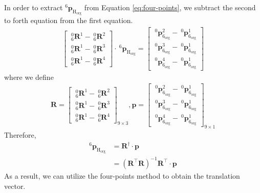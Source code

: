 \par
In order to extract $^\mathrm{6}\!\boldsymbol{p}_\mathrm{H_{org}}$ from Equation \ref{eq:four-points}, we subtract the second to forth equation from the first equation.
\begin{equation}
\begin{split}	
\begin{bmatrix}
\  _{\mathrm{6}}^{\mathrm{0}}\mathbf{R}^{1} - \  _{\mathrm{6}}^{\mathrm{0}}\mathbf{R}^{2}\\ 
\  _{\mathrm{6}}^{\mathrm{0}}\mathbf{R}^{1} - \  _{\mathrm{6}}^{\mathrm{0}}\mathbf{R}^{3}\\ 
\  _{\mathrm{6}}^{\mathrm{0}}\mathbf{R}^{1} - \  _{\mathrm{6}}^{\mathrm{0}}\mathbf{R}^{4}
\end{bmatrix}
\cdot\ ^\mathrm{6}\!\boldsymbol{p}_\mathrm{H_{org}}
=
\begin{bmatrix}
\ ^\mathrm{0}\!\boldsymbol{p}_\mathrm{6_{org}}^{2} -\ ^\mathrm{0}\!\boldsymbol{p}_\mathrm{6_{org}}^{1} \\ 
\ ^\mathrm{0}\!\boldsymbol{p}_\mathrm{6_{org}}^{3} -\ ^\mathrm{0}\!\boldsymbol{p}_\mathrm{6_{org}}^{1} \\ 
\ ^\mathrm{0}\!\boldsymbol{p}_\mathrm{6_{org}}^{4} -\ ^\mathrm{0}\!\boldsymbol{p}_\mathrm{6_{org}}^{1} 
\end{bmatrix}
\end{split}
\end{equation}
where we define
\begin{equation*}
\begin{split}
\mathbf{R} =  
\begin{bmatrix}
\  _{\mathrm{6}}^{\mathrm{0}}\mathbf{R}^{1} - \  _{\mathrm{6}}^{\mathrm{0}}\mathbf{R}^{2}\\ 
\  _{\mathrm{6}}^{\mathrm{0}}\mathbf{R}^{1} - \  _{\mathrm{6}}^{\mathrm{0}}\mathbf{R}^{3}\\ 
\  _{\mathrm{6}}^{\mathrm{0}}\mathbf{R}^{1} - \  _{\mathrm{6}}^{\mathrm{0}}\mathbf{R}^{4}
\end{bmatrix}_{9 \times 3}, 
\boldsymbol{p} = 
\begin{bmatrix}
\ ^\mathrm{0}\!\boldsymbol{p}_\mathrm{6_{org}}^{2} -\ ^\mathrm{0}\!\boldsymbol{p}_\mathrm{6_{org}}^{1} \\ 
\ ^\mathrm{0}\!\boldsymbol{p}_\mathrm{6_{org}}^{3} -\ ^\mathrm{0}\!\boldsymbol{p}_\mathrm{6_{org}}^{1} \\ 
\ ^\mathrm{0}\!\boldsymbol{p}_\mathrm{6_{org}}^{4} -\ ^\mathrm{0}\!\boldsymbol{p}_\mathrm{6_{org}}^{1} 
\end{bmatrix}_{9 \times 1}
\end{split}
\end{equation*}
Therefore,
\begin{equation*}
\begin{split}
^\mathrm{6}\!\boldsymbol{p}_\mathrm{H_{org}} 	&= \mathbf{R}^{\dagger} \cdot \boldsymbol{p}\\
					  							&= \left( \mathbf{R}^\top\mathbf{R}\right) ^{-1}\mathbf{R}^\top \cdot \boldsymbol{p}
\end{split}
\end{equation*}
As a result, we can utilize the four-points method to obtain the translation vector.
